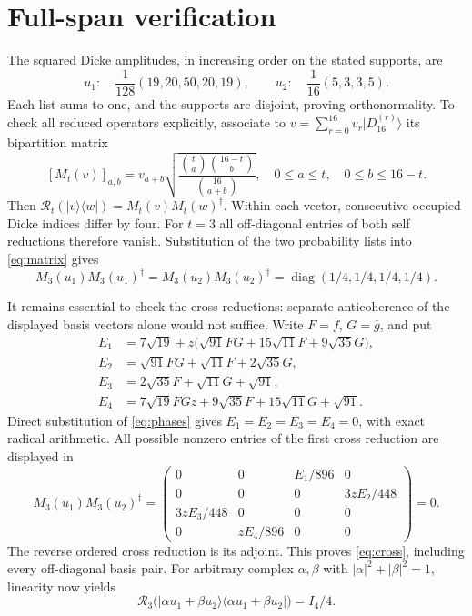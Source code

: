 \documentclass[11pt]{article}
\newcommand{\D}[1]{\lvert D_{16}^{(#1)}\rangle}
\newcommand{\R}{\mathcal R}
\begin{document}
\section{Full-span verification}
The squared Dicke amplitudes, in increasing order on the stated supports, are
\begin{equation}
 u_1:\quad \frac1{128}(19,20,50,20,19),\qquad
 u_2:\quad \frac1{16}(5,3,3,5).
\end{equation}
Each list sums to one, and the supports are disjoint, proving
orthonormality. To check all reduced operators explicitly, associate to
$v=\sum_{r=0}^{16}v_r\D r$ its bipartition matrix
\begin{equation}\label{eq:matrix}
 [M_t(v)]_{a,b}=v_{a+b}
 \sqrt{\frac{\binom ta\binom{16-t}b}{\binom{16}{a+b}}},
 \quad 0\le a\le t,\quad0\le b\le16-t.
\end{equation}
Then $\R_t(\lvert v\rangle\langle w\rvert)=M_t(v)M_t(w)^\dagger$.
Within each vector, consecutive occupied Dicke indices differ by four.
For $t=3$ all off-diagonal entries of both self reductions therefore
vanish. Substitution of the two probability lists into
\eqref{eq:matrix} gives
\begin{equation}
 M_3(u_1)M_3(u_1)^\dagger=M_3(u_2)M_3(u_2)^\dagger
 =\operatorname{diag}(1/4,1/4,1/4,1/4).
\end{equation}

It remains essential to check the cross reductions: separate
anticoherence of the displayed basis vectors alone would not suffice.
Write $F=\overline f$, $G=\overline g$, and put
\begin{align}
 E_1&=7\sqrt{19}+z\bigl(\sqrt{91}FG+15\sqrt{11}F+9\sqrt{35}G\bigr),\\
 E_2&=\sqrt{91}FG+\sqrt{11}F+2\sqrt{35}G,\\
 E_3&=2\sqrt{35}F+\sqrt{11}G+\sqrt{91},\\
 E_4&=7\sqrt{19}FGz+9\sqrt{35}F+15\sqrt{11}G+\sqrt{91}.
\end{align}
Direct substitution of \eqref{eq:phases} gives
$E_1=E_2=E_3=E_4=0$, with exact radical arithmetic. All possible nonzero
entries of the first cross reduction are displayed in
\begin{equation}
 M_3(u_1)M_3(u_2)^\dagger=
 \begin{pmatrix}
 0&0&E_1/896&0\\
 0&0&0&3zE_2/448\\
 3zE_3/448&0&0&0\\
 0&zE_4/896&0&0
 \end{pmatrix}=0.
\end{equation}
The reverse ordered cross reduction is its adjoint. This proves
\eqref{eq:cross}, including every off-diagonal basis pair. For arbitrary
complex $\alpha,\beta$ with $|\alpha|^2+|\beta|^2=1$, linearity now yields
\begin{equation}
 \R_3\bigl(\lvert\alpha u_1+\beta u_2\rangle
 \langle\alpha u_1+\beta u_2\rvert\bigr)=I_4/4.
\end{equation}
\end{document}

